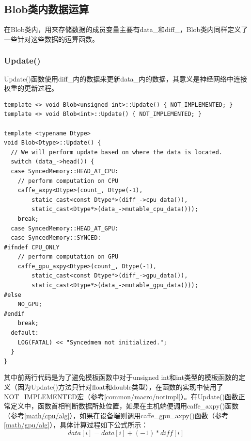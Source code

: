\subsection{Blob类内数据运算}
在Blob类内，用来存储数据的成员变量主要有data\_和diff\_，Blob类内同样定义了一些针对这些数据的运算函数。
\subsubsection{Update()}
Update()函数使用diff\_内的数据来更新data\_内的数据，其意义是神经网络中连接权重的更新过程。
\begin{verbatim}
template <> void Blob<unsigned int>::Update() { NOT_IMPLEMENTED; }
template <> void Blob<int>::Update() { NOT_IMPLEMENTED; }

template <typename Dtype>
void Blob<Dtype>::Update() {
  // We will perform update based on where the data is located.
  switch (data_->head()) {
  case SyncedMemory::HEAD_AT_CPU:
    // perform computation on CPU
    caffe_axpy<Dtype>(count_, Dtype(-1),
        static_cast<const Dtype*>(diff_->cpu_data()),
        static_cast<Dtype*>(data_->mutable_cpu_data()));
    break;
  case SyncedMemory::HEAD_AT_GPU:
  case SyncedMemory::SYNCED:
#ifndef CPU_ONLY
    // perform computation on GPU
    caffe_gpu_axpy<Dtype>(count_, Dtype(-1),
        static_cast<const Dtype*>(diff_->gpu_data()),
        static_cast<Dtype*>(data_->mutable_gpu_data()));
#else
    NO_GPU;
#endif
    break;
  default:
    LOG(FATAL) << "Syncedmem not initialized.";
  }
}
\end{verbatim}
其中前两行代码是为了避免模板函数中对于unsigned int和int类型的模板函数的定义（因为Update()方法只针对float和double类型），在函数的实现中使用了NOT\_IMPLEMENTED宏（参考\ref{common/macro/notimpl}）。在Update()函数正常定义中，函数首相判断数据所处位置，如果在主机端便调用caffe\_axpy()函数（参考\ref{math/cpu/alg}），如果在设备端则调用caffe\_gpu\_axpy()函数（参考\ref{math/gpu/alg}），具体计算过程如下公式所示：
$$
data[i] = data[i] + (-1) * diff[i]
$$

